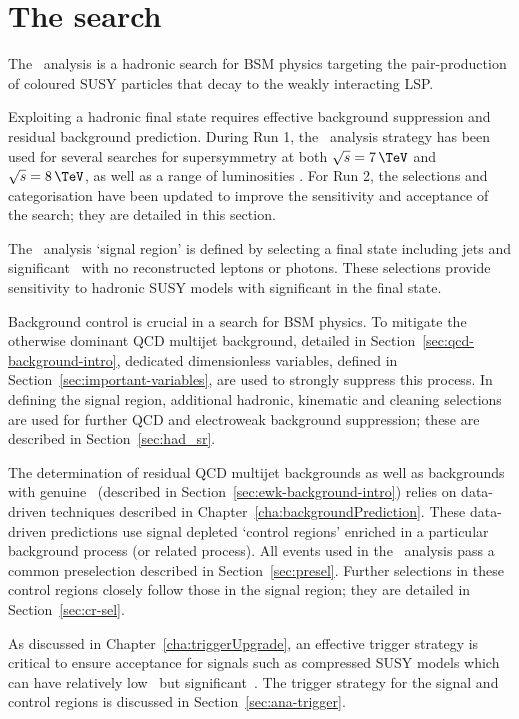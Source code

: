 \chapter{The \alphat search}
\label{cha:alphat}

The \alphat~analysis is a hadronic search for BSM physics 
targeting the pair-production of coloured SUSY particles that
decay to the weakly interacting LSP.

Exploiting a hadronic final state requires effective 
background suppression and residual background prediction. During Run 1, 
the \alphat~analysis strategy has been used for several searches for supersymmetry at
both $\sqrt{s} = 7\,\TeV$ and $\sqrt{s} = 8\,\TeV$, as well as a range of luminosities
\cite{alphaT1,alphaT2,alphaT3,alphaT4}. For Run 2, the selections and categorisation 
have been updated to improve the sensitivity and acceptance of the search; they are detailed
in this section.

The \alphat~analysis `signal region' is defined by selecting a final state 
including jets and significant \met~with no reconstructed leptons or photons. 
These selections provide sensitivity to hadronic SUSY models with significant \met
in the final state.

Background control is crucial in a search for BSM physics. To mitigate the otherwise 
dominant QCD multijet background, detailed in Section~\ref{sec:qcd-background-intro}, dedicated dimensionless variables, 
defined in Section~\ref{sec:important-variables}, are used to strongly suppress this process.
In defining the signal region, additional hadronic, kinematic and cleaning selections 
are used for further QCD and electroweak background suppression; these are described in 
Section~\ref{sec:had_sr}.

The determination of residual QCD multijet backgrounds as well as backgrounds with 
genuine \met~(described in Section~\ref{sec:ewk-background-intro}) relies on data-driven techniques 
described in Chapter~\ref{cha:backgroundPrediction}. These data-driven predictions use signal 
depleted `control regions' enriched in a particular background process 
(or related process). All events used in the \alphat~analysis pass
a common preselection described in Section~\ref{sec:presel}. Further selections in
these control regions closely follow those in the signal region; they are detailed in 
Section~\ref{sec:cr-sel}.

As discussed in Chapter~\ref{cha:triggerUpgrade}, an effective trigger strategy is 
critical to ensure acceptance for signals such as compressed SUSY models which can have 
relatively low \scalht~but significant~\mht. The trigger strategy for the signal and control regions
is discussed in Section~\ref{sec:ana-trigger}.

